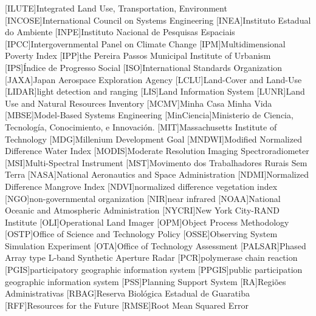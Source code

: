 \begin{acronym}[HyperLEAVES]
[ILUTE]{Integrated Land Use, Transportation, Environment}
[INCOSE]{International Council on Systems Engineering}
[INEA]{Instituto Estadual do Ambiente}
[INPE]{Instituto Nacional de Pesquisas Espaciais}
[IPCC]{Intergovernmental Panel on Climate Change}
[IPM]{Multidimensional Poverty Index}
[IPP]{the Pereira Passos Municipal Institute of Urbanism}
[IPS]{Índice de Progresso Social}
[ISO]{International Standards Organization}
[JAXA]{Japan Aerospace Exploration Agency}
[LCLU]{Land-Cover and Land-Use}
[LIDAR]{light detection and ranging}
[LIS]{Land Information System}
[LUNR]{Land Use and Natural Resources Inventory}
[MCMV]{Minha Casa Minha Vida}
[MBSE]{Model-Based Systems Engineering}
[MinCiencia]{Ministerio de Ciencia, Tecnología, Conocimiento, e Innovación.}
[MIT]{Massachusetts Institute of Technology}
[MDG]{Millenium Development Goal}
[MNDWI]{Modified Normalized Difference Water Index}
[MODIS]{Moderate Resolution Imaging Spectroradiometer}
[MSI]{Multi-Spectral Instrument}
[MST]{Movimento dos Trabalhadores Rurais Sem Terra}
[NASA]{National Aeronautics and Space Administration}
[NDMI]{Normalized Difference Mangrove Index}
[NDVI]{normalized difference vegetation index}
[NGO]{non-governmental organization}
[NIR]{near infrared}
[NOAA]{National Oceanic and Atmospheric Administration}
[NYCRI]{New York City-RAND Institute}
[OLI]{Operational Land Imager}
[OPM]{Object Process Methodology}
[OSTP]{Office of Science and Technology Policy}
[OSSE]{Observing System Simulation Experiment}
[OTA]{Office of Technology Assessment}
[PALSAR]{Phased Array type L-band Synthetic Aperture Radar}
[PCR]{polymerase chain reaction}
[PGIS]{participatory geographic information system}
[PPGIS]{public participation geographic information system}
[PSS]{Planning Support System}
[RA]{Regiões Administrativas}
[RBAG]{Reserva Biológica Estadual de Guaratiba}
[RFF]{Resources for the Future}
[RMSE]{Root Mean Squared Error}

\end{acronym}
